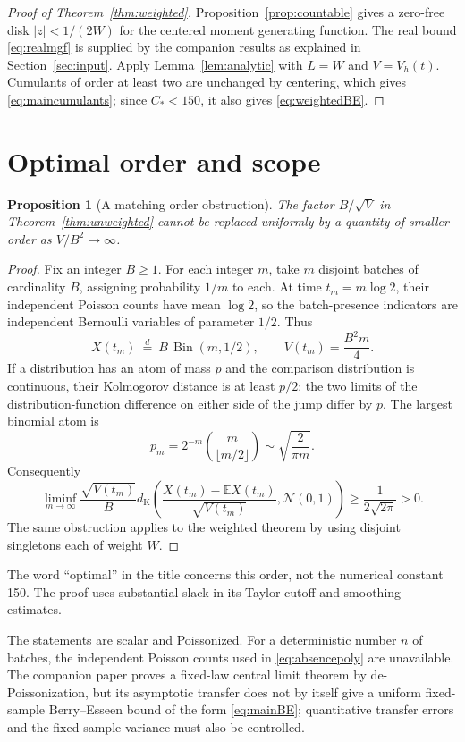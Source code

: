 \documentclass[11pt]{article}
\numberwithin{equation}{section}
\newtheorem{proposition}[theorem]{Proposition}
\theoremstyle{remark}
\newcommand{\E}{\mathbb E}
\newcommand{\Bin}{\operatorname{Bin}}
\newcommand{\dK}{d_{\mathrm K}}
\newcommand{\Normal}{\mathcal N(0,1)}
\begin{document}
\begin{proof}[Proof of Theorem~\ref{thm:weighted}]
Proposition~\ref{prop:countable} gives a zero-free disk $|z|<1/(2W)$ for
the centered moment generating function. The real bound
\eqref{eq:realmgf} is supplied by the companion results as explained in
Section~\ref{sec:input}. Apply Lemma~\ref{lem:analytic} with $L=W$ and
$V=V_h(t)$. Cumulants of order at least two are unchanged by centering,
which gives \eqref{eq:maincumulants}; since $C_*<150$, it also gives
\eqref{eq:weightedBE}.
\end{proof}

\section{Optimal order and scope}\label{sec:scope}

\begin{proposition}[A matching order obstruction]\label{prop:sharpness}
The factor $B/\sqrt V$ in Theorem~\ref{thm:unweighted} cannot be replaced
uniformly by a quantity of smaller order as $V/B^2\to\infty$.
\end{proposition}
\begin{proof}
Fix an integer $B\ge1$. For each integer $m$, take $m$ disjoint batches of cardinality
$B$, assigning probability $1/m$ to each. At time $t_m=m\log2$, their
independent Poisson counts have mean $\log2$, so the batch-presence
indicators are independent Bernoulli variables of parameter $1/2$. Thus
\[
 X(t_m)\ \stackrel{d}{=}\ B\,\Bin(m,1/2),
 \qquad V(t_m)=\frac{B^2m}{4}.
\]
If a distribution has an atom of mass $p$ and the comparison distribution
is continuous, their Kolmogorov distance is at least $p/2$: the two limits
of the distribution-function difference on either side of the jump differ
by $p$. The largest binomial atom is
\[
 p_m=2^{-m}\binom{m}{\lfloor m/2\rfloor}
 \sim\sqrt{\frac2{\pi m}}.
\]
Consequently
\[
 \liminf_{m\to\infty}\frac{\sqrt{V(t_m)}}{B}
 \dK\left(\frac{X(t_m)-\E X(t_m)}{\sqrt{V(t_m)}},\Normal\right)
 \ge\frac1{2\sqrt{2\pi}}>0.
\]
The same obstruction applies to the weighted theorem by using disjoint
singletons each of weight $W$.
\end{proof}

The word ``optimal'' in the title concerns this order, not the numerical
constant 150. The proof uses substantial slack in its Taylor cutoff and
smoothing estimates.

The statements are scalar and Poissonized. For a deterministic number $n$
of batches, the independent Poisson counts used in
\eqref{eq:absencepoly} are unavailable. The companion paper proves a
fixed-law central limit theorem by de-Poissonization, but its asymptotic
transfer does not by itself give a uniform fixed-sample Berry--Esseen bound
of the form \eqref{eq:mainBE}; quantitative transfer errors and the
fixed-sample variance must also be controlled.
\end{document}
